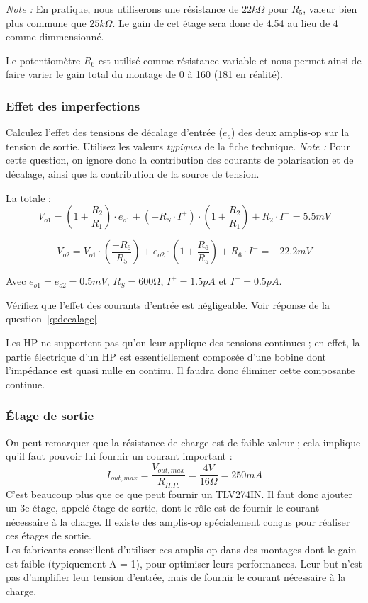 \textit{Note :} En pratique, nous utiliserons une résistance de $22 k\Omega$ pour $R_5$, valeur bien plus commune que $25 k\Omega$. Le gain de cet étage sera donc de 4.54 au lieu de 4 comme dimmensionné.

Le potentiomètre $R_6$ est utilisé comme résistance variable et nous permet ainsi de faire varier le gain total du montage de 0 à 160 (181 en réalité).

\subsubsection{Effet des imperfections}

{\label{q:decalage}
Calculez l'effet des tensions de décalage d'entrée ($e_o$) des deux amplis-op sur la tension de sortie. Utilisez les valeurs \textit{typiques} de la fiche technique.
\textit{Note :} Pour cette question, on ignore donc la contribution des courants de polarisation et de décalage, ainsi que la contribution de la source de tension.
}
{La totale : $$V_{o1} = \left(1 + \frac{R_2}{R_1}\right) \cdot e_{o1} + (-R_S\cdot I^+) \cdot \left(1 + \frac{R_2}{R_1} \right) + R_2\cdot I^- = 5.5 mV$$

$$V_{o2} = V_{o1} \cdot \left( \frac{-R_6}{R_5} \right) + e_{o2} \cdot \left( 1 + \frac{R_6}{R_5} \right) + R_6 \cdot I^- = -22.2 mV$$

Avec $e_{o1} = e_{o2} = 0.5 mV$, $R_S = 600 \si{\ohm}$, $I^+ = 1.5 pA$ et $I^-= 0.5 pA$.
}

{
Vérifiez que l'effet des courants d'entrée est négligeable.
}
{Voir réponse de la question~\ref{q:decalage}}

Les HP ne supportent pas qu'on leur applique des tensions continues ; en effet, la partie électrique d'un HP est essentiellement composée d'une bobine dont l'impédance est quasi nulle en continu. Il faudra donc éliminer cette composante continue.

\subsubsection{Étage de sortie}
On peut remarquer que la résistance de charge est de faible valeur ; cela implique qu'il faut pouvoir lui fournir un courant important :
$$I_{out,max}=\frac{V_{out,max}}{R_{H.P.}}=\frac{4V}{16\Omega}=250mA$$
C'est beaucoup plus que ce que peut fournir un TLV274IN. Il faut donc ajouter un 3e étage, appelé étage de sortie, dont le rôle est de fournir le courant nécessaire à la charge. Il existe des amplis-op spécialement conçus pour réaliser ces étages de sortie.\\
Les fabricants conseillent d'utiliser ces amplis-op dans des montages dont le gain est faible (typiquement A = 1), pour optimiser leurs performances. Leur but n'est pas d'amplifier leur tension d'entrée, mais de fournir le courant
nécessaire à la charge.

